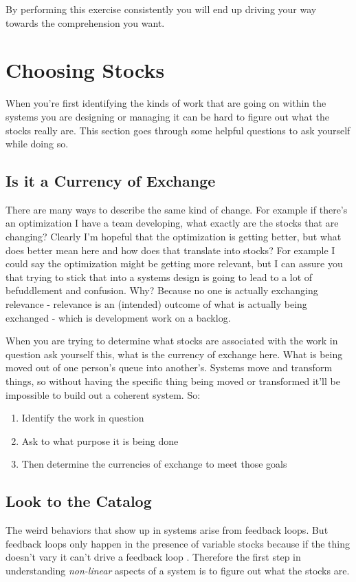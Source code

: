 \documentclass[11pt,a5paper]{book}
\begin{document}
By performing this exercise consistently you will end up driving your way towards the comprehension you want. 

\section{Choosing Stocks}
When you're first identifying the kinds of work that are going on within the systems you are designing or managing it can be hard to figure out what the stocks really are. This section goes through some helpful questions to ask yourself while doing so.

\subsection{Is it a Currency of Exchange}
There are many ways to describe the same kind of change. For example if there's an optimization I have a team developing, what exactly are the stocks that are changing? Clearly I'm hopeful that the optimization is getting better, but what does better mean here and how does that translate into stocks? For example I could say the optimization might be getting more relevant, but I can assure you that trying to stick that into a systems design is going to lead to a lot of befuddlement and confusion. Why? Because no one is actually exchanging relevance - relevance is an (intended) outcome of what is actually being exchanged - which is development work on a backlog. 
\newline

When you are trying to determine what stocks are associated with the work in question ask yourself this, what is the currency of exchange here. What is being moved out of one person's queue into another's. Systems move and transform things, so without having the specific thing being moved or transformed it'll be impossible to build out a coherent system. So:

\begin{enumerate}
\item Identify the work in question
\item Ask to what purpose it is being done
\item Then determine the currencies of exchange to meet those goals
\end{enumerate}

\subsection{Look to the Catalog}
The weird behaviors that show up in systems arise from feedback loops. But feedback loops only happen in the presence of variable stocks because if the thing doesn't vary it can't drive a feedback loop \cite{meadows}. Therefore the first step in understanding \textit{non-linear} aspects of a system is to figure out what the stocks are.
\newline
\end{document}
